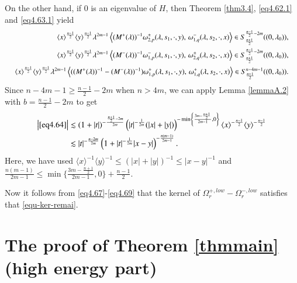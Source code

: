 \documentclass[11pt,reqno]{amsart}
\numberwithin{equation}{section}
\theoremstyle{definition}
\begin{document}
On the other hand, if $0$ is an eigenvalue of $H$, then Theorem \ref{thm3.4}, \eqref{eq4.62.1} and \eqref{eq4.63.1} yield
\begin{equation*}\small
	\begin{split}
		\langle x\rangle^{\frac{n-1}{2}} \langle y\rangle^{\frac{n-1}{2}}\lambda^{2m-1}\left\langle  (M^+(\lambda))^{-1}\omega_{2,p}^{\pm}(\lambda,s_{1},\cdot,y),\,\omega_{1,q}^{-}(\lambda,s_{2},\cdot,x)\right\rangle\in S_{\frac{n+1}{2}}^{\frac{n-1}{2}-2m}((0,\lambda_{0})),\\
		\langle x\rangle^{\frac{n-1}{2}} \langle y\rangle^{\frac{n-1}{2}}\lambda^{2m-1}\left\langle  (M^-(\lambda))^{-1}\omega_{1,p}^{-}(\lambda,s_{1},\cdot,y),\,\omega_{2,q}^{\pm}(\lambda,s_{2},\cdot,x)\right\rangle\in S_{\frac{n+1}{2}}^{\frac{n-1}{2}-2m}((0,\lambda_{0})),\\
		\langle x\rangle^{\frac{n-1}{2}} \langle y\rangle^{\frac{n-1}{2}}\lambda^{2m-1}\left\langle ((M^+(\lambda))^{-1}-(M^-(\lambda))^{-1})\omega_{1,p}^{+}(\lambda,s_{1},\cdot,y),\,\omega_{1,q}^{+}(\lambda,s_{2},\cdot,x)\right\rangle \in S_{\frac{n+1}{2}}^{n-4m-1}((0,\lambda_{0})).
	\end{split}
\end{equation*}
Since $n-4m-1\geq \frac{n-1}{2}-2m$ when $n>4m$, we can apply Lemma \ref{lemmaA.2} with $b=\frac{n-1}{2}-2m$ to get
\begin{equation} \label{eq4.69}
\begin{aligned}
	\left| \eqref{eq4.64}\right|
	&\lesssim(1+|t|)^{-\frac{\frac{n+1}{2}-2m}{2m}} \left( |t|^{-\frac{1}{2m}}(|x|+|y|)\right) ^{-\min\left\{\frac{3m-\frac{n+1}{2}}{2m-1},0\right\}}\langle x\rangle^{-\frac{n-1}{2}} \langle y\rangle^{-\frac{n-1}{2}}\\
	&\lesssim |t|^{-\frac{n-2m}{2m}}\left(1+|t|^{-\frac{1}{2m}}|x-y|\right)^{-\frac{n(m-1)}{2m-1}}.\\
\end{aligned}
\end{equation}
Here, we have used $\langle x\rangle^{-1}\langle y\rangle^{-1}\le (|x|+|y|)^{-1}\le |x-y|^{-1}$ and
$\mbox{$\frac{n(m-1)}{2m-1}\le  \min\{\frac{3m-\frac{n+1}{2}}{2m-1},0\}+\frac{n-1}{2}$}.$

Now it follows from \eqref{eq4.67}-\eqref{eq4.69} that the kernel of $\Omega_{r}^{+, low}-\Omega_{r}^{-, low}$ satisfies that 
\eqref{equ-ker-remai}.



\section{The proof of Theorem \ref{thmmain} (high energy part)}\label{section4}
\end{document}
